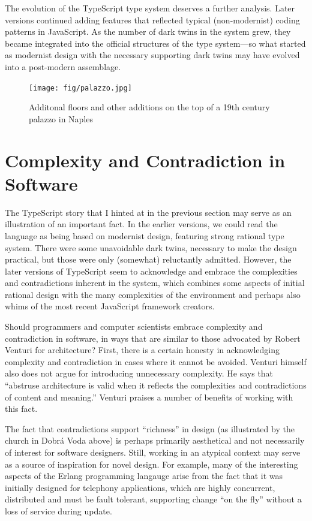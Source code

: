 The evolution of the TypeScript type system deserves a further analysis. Later versions
continued adding features that reflected typical (non-modernist) coding patterns
in JavaScript. As the number of dark twins in the system grew, they became integrated into the
official structures of the type system---so what started as modernist design with the necessary
supporting dark twins may have evolved into a post-modern assemblage.

\begin{figure}
  \centering
  \texttt{[image: fig/palazzo.jpg]}
  \caption{Additonal floors and other additions on the top of a 19th century palazzo in Naples}
  \label{fig:palazzo}
\end{figure}

\section{Complexity and Contradiction in Software}

The TypeScript story that I hinted at in the previous section may serve as an illustration of an
important fact. In the earlier versions, we could read the language as being based on modernist
design, featuring strong rational type system. There were some unavoidable dark twins, necessary
to make the design practical, but those were only (somewhat) reluctantly admitted. However, the
later versions of TypeScript seem to acknowledge and embrace the complexities and contradictions
inherent in the system, which combines some aspects of initial rational design with the many
complexities of the environment and perhaps also whims of the most recent JavaScript framework
creators.

Should programmers and computer scientists embrace complexity and contradiction in software,
in ways that are similar to those advocated by Robert Venturi for architecture? First, there
is a certain honesty in acknowledging complexity and contradiction in cases where it cannot
be avoided. Venturi himself also does not argue for introducing unnecessary complexity. He says
that ``abstruse architecture is valid when it reflects the complexities and contradictions of
content and meaning.'' Venturi praises a number of benefits
of working with this fact.

The fact that contradictions support ``richness'' in design (as illustrated by the church in
Dobrá Voda above) is perhaps primarily aesthetical and not necessarily of interest for software
designers. Still, working in an atypical context may serve as a source of inspiration for novel
design. For example, many of the interesting aspects of the Erlang programming langauge arise
from the fact that it was initially designed for telephony applications, which are highly
concurrent, distributed and must be fault tolerant, supporting change ``on the fly'' without
a loss of service during update.

